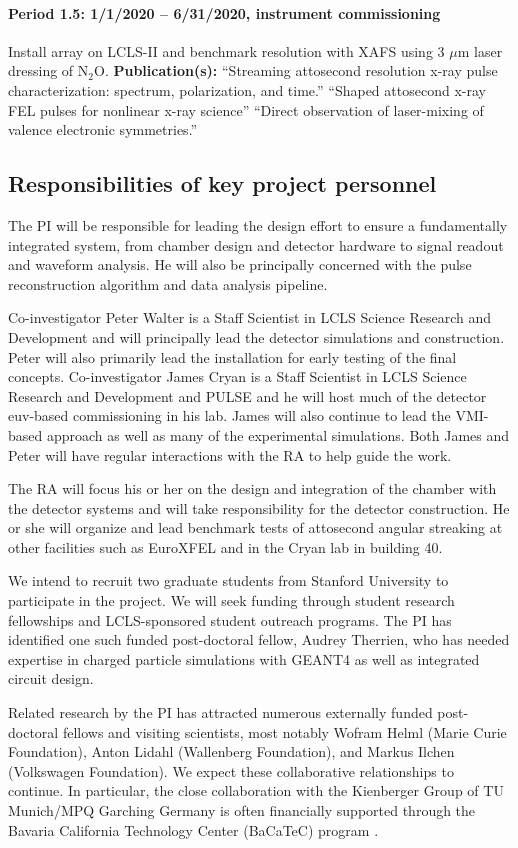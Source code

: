 \paragraph*{Period 1.5: 1/1/2020 -- 6/31/2020, instrument commissioning\\}
Install array on LCLS-II and benchmark resolution with XAFS using 3 $\mu$m laser dressing of N$_2$O.
\textbf{Publication(s): }
``Streaming attosecond resolution x-ray pulse characterization: spectrum, polarization, and time.''
``Shaped attosecond x-ray FEL pulses for nonlinear x-ray science''
``Direct observation of laser-mixing of valence electronic symmetries.''

\subsection*{Responsibilities of key project personnel}
The PI will be responsible for leading the design effort to ensure a fundamentally integrated system, from chamber design and detector hardware to signal readout and waveform analysis.
He will also be principally concerned with the pulse reconstruction algorithm and data analysis pipeline.

Co-investigator Peter Walter is a Staff Scientist in LCLS Science Research and Development and will principally lead the detector simulations and construction.
Peter will also primarily lead the installation for early testing of the final concepts.
Co-investigator James Cryan is a Staff Scientist in LCLS Science Research and Development and PULSE and he will host much of the detector euv-based commissioning in his lab.
James will also continue to lead the VMI-based approach as well as many of the experimental simulations.
Both James and Peter will have regular interactions with the RA to help guide the work.

The RA will focus his or her on the design and integration of the chamber with the detector systems and will take responsibility for the detector construction.
He or she will organize and lead benchmark tests of attosecond angular streaking at other facilities such as EuroXFEL and in the Cryan lab in building 40.

We intend to recruit two graduate students from Stanford University to participate in the project.
We will seek funding through student research fellowships and LCLS-sponsored student outreach programs.
The PI has identified one such funded post-doctoral fellow, Audrey Therrien, who has needed expertise in charged particle simulations with GEANT4 as well as integrated circuit design.

Related research by the PI has attracted numerous externally funded post-doctoral fellows and visiting scientists, most notably Wofram Helml (Marie Curie Foundation), Anton Lidahl (Wallenberg Foundation), and Markus Ilchen (Volkswagen Foundation).
We expect these collaborative relationships to continue.
In particular, the close collaboration with the Kienberger Group of TU Munich/MPQ Garching Germany is often financially supported through the Bavaria California Technology Center (BaCaTeC) program \cite{BaCaTeC}.
